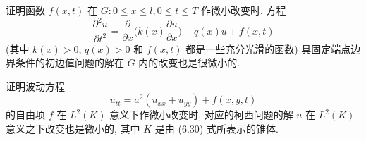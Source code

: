 \begin{exercise}
  证明函数 $f(x,t)$ 在 $G\colon 0\leq x\leq l, 0\leq t\leq T$ 作微小改变时, 方程
  \[\frac{\partial^2 u}{\partial t^2}
    = \frac{\partial}{\partial x}\biggl(k(x)\frac{\partial u}{\partial x}\biggr)
      -q(x)u + f(x,t)\]
  (其中 $k(x)>0$, $q(x)>0$ 和 $f(x,t)$ 都是一些充分光滑的函数)
  具固定端点边界条件的初边值问题的解在 $G$ 内的改变也是很微小的.
\end{exercise}



\begin{exercise}
  证明波动方程
  \[u_{tt} = a^2(u_{xx}+u_{yy}) + f(x,y,t)\]
  的自由项 $f$ 在 $L^2(K)$ 意义下作微小改变时, 对应的柯西问题的解 $u$ 在
  $L^2(K)$ 意义之下改变也是微小的, 其中 $K$ 是由 (6.30) 式所表示的锥体.
\end{exercise}

